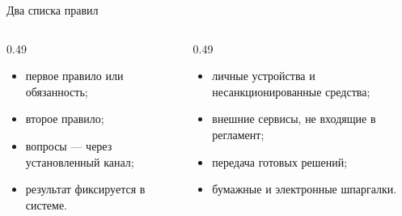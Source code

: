 \begin{frame}{Два списка правил}
  \vspace{0.2em}
  \begin{columns}[T]
    \begin{column}{0.49\textwidth}
      \begin{itemize}\setlength\itemsep{0.3em}
        \item первое правило или обязанность;
        \item второе правило;
        \item вопросы --- через установленный канал;
        \item результат фиксируется в системе.
      \end{itemize}
    \end{column}
    \begin{column}{0.49\textwidth}
      \begin{itemize}\setlength\itemsep{0.3em}
        \item личные устройства и несанкционированные средства;
        \item внешние сервисы, не входящие в регламент;
        \item передача готовых решений;
        \item бумажные и электронные шпаргалки.
      \end{itemize}
    \end{column}
  \end{columns}
\end{frame}
